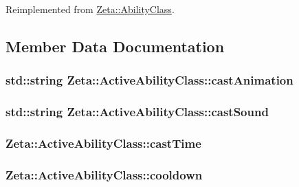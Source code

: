 Reimplemented from \hyperlink{classZeta_1_1AbilityClass_a3535ae18fef8d447febab98c85e169f3}{Zeta\+::\+Ability\+Class}.



\subsection{Member Data Documentation}
\hypertarget{classZeta_1_1ActiveAbilityClass_a0571f13949f9bbdcf09b23ee645fda98}{
\subsubsection[{cast\+Animation}]{\setlength{\rightskip}{0pt plus 5cm}std\+::string Zeta\+::\+Active\+Ability\+Class\+::cast\+Animation\hspace{0.3cm}{\ttfamily [private]}}}\label{classZeta_1_1ActiveAbilityClass_a0571f13949f9bbdcf09b23ee645fda98}
\hypertarget{classZeta_1_1ActiveAbilityClass_af7987f069a6f1f166ba58bb181926752}{
\subsubsection[{cast\+Sound}]{\setlength{\rightskip}{0pt plus 5cm}std\+::string Zeta\+::\+Active\+Ability\+Class\+::cast\+Sound\hspace{0.3cm}{\ttfamily [private]}}}\label{classZeta_1_1ActiveAbilityClass_af7987f069a6f1f166ba58bb181926752}
\hypertarget{classZeta_1_1ActiveAbilityClass_a7aceb1c38d3a0aa9796903f5d32d750f}{
\subsubsection[{cast\+Time}]{ Zeta\+::\+Active\+Ability\+Class\+::cast\+Time\hspace{0.3cm}{\ttfamily [private]}}}\label{classZeta_1_1ActiveAbilityClass_a7aceb1c38d3a0aa9796903f5d32d750f}
\hypertarget{classZeta_1_1ActiveAbilityClass_a2f97b3b77b0a02adf554af6e59fa81fb}{
\subsubsection[{cooldown}]{ Zeta\+::\+Active\+Ability\+Class\+::cooldown\hspace{0.3cm}{\ttfamily [private]}}}\label{classZeta_1_1ActiveAbilityClass_a2f97b3b77b0a02adf554af6e59fa81fb}
